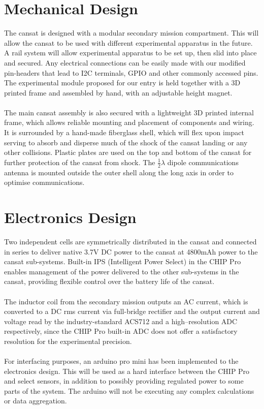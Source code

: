 \documentclass{report}
\begin{document}
	\section{Mechanical Design}
		The cansat is designed with a modular secondary mission compartment. 
		This will allow the cansat to be used with different experimental apparatus 
		in the future. A rail system will allow experimental apparatus to be set up,
		then slid into place and secured. Any electrical connections can be easily
		made with our modified pin-headers that lead to I2C terminals, GPIO and
		other commonly accessed pins. The experimental module proposed for 
		our entry is held together with a 3D printed frame and assembled by 
		hand, with an adjustable height magnet.
		\\\\
		The main cansat assembly is also secured with a lightweight 3D printed
		internal frame, which allows reliable mounting and placement of components
		and wiring. It is surrounded by a hand-made fiberglass shell, which will flex
		upon impact serving to absorb and disperse much of the shock of the
		cansat landing or any other collisions. Plastic plates are used on the top and
		bottom of the cansat for further protection of the cansat from shock. The 
		$\frac{1}{2}\lambda$ dipole communications antenna is mounted outside
		the outer shell along the long axis in order to optimise communications.

	\section{Electronics Design}
		Two independent cells are symmetrically distributed in the cansat and
		connected in series to deliver native 3.7V DC power to the cansat at 
		4800mAh power to the cansat sub-systems.
		Built-in IPS (Intelligent Power Select) in the CHIP Pro enables management
		of the power delivered to the other sub-systems in the cansat, providing
		flexible control over the battery life of the cansat. 
		\\\\
		The inductor coil from the secondary mission outputs an AC current, which
		is converted to a DC rms current via full-bridge rectifier and the output
		current and voltage read by the industry-standard ACS712 and a 
		high--resolution ADC respectively, since the CHIP Pro built-in ADC 
		does not offer a satisfactory resolution for the experimental precision.
		\\\\
		{\color{blue}For interfacing purposes, an arduino pro mini has been
		implemented to the electronics design. This will be used as a hard interface
		between the CHIP Pro and select sensors, in addition to possibly providing
		regulated power to some parts of the system. The arduino will not be 
		executing any complex calculations or data aggregation.}
\end{document}
